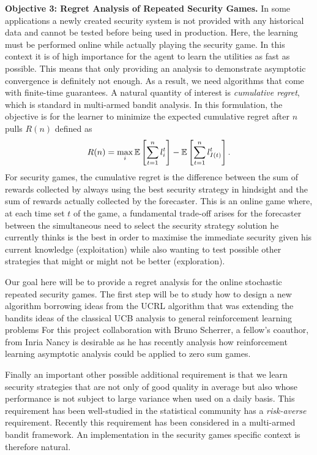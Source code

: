 \textbf{Objective 3: Regret Analysis of Repeated Security Games.}
In some applications a newly created security system is not provided with any historical data and cannot be tested before being used in production. Here, the learning must be performed online while actually playing the security game. In this context it is of high importance for the agent to learn the utilities as fast as possible. This means that only providing an analysis to demonstrate asymptotic convergence is definitely not enough. As a result, we need algorithms that come with finite-time guarantees. A natural quantity of interest is \textit{cumulative regret},  which is standard  in multi-armed bandit analysis. In this formulation, the objective is for the learner to minimize the expected cumulative regret after $n$ pulls $R(n)$ defined as
%
\begin{equation*}
R(n)=\max_i{\mathbb{E}}\left[\sum^n_{t=1} l^t_{i}\right]-{\mathbb{E}}\left[\sum_{t=1}^n l^t_{I(t)}\right].
\end{equation*}
%
For security games, the cumulative regret is the difference between the sum of rewards collected by always using the best security strategy in hindsight and the sum of rewards actually collected by the forecaster.
This is an online game where, at each time set $t$ of the game, a fundamental trade-off arises for the forecaster between the simultaneous need to select the security strategy solution he currently thinks is the best in order to maximise the immediate security given his current knowledge  (exploitation)  while also wanting to test possible other strategies that might or might not be better (exploration).

Our goal here will be to provide a regret analysis for the online stochastic repeated security games. The first step will be to study  how to design a new algorithm borrowing ideas from the UCRL algorithm \cite{auer2009near} that was extending the bandits ideas of the classical UCB analysis to general reinforcement learning problems
For this project collaboration with  Bruno Scherrer, a fellow's coauthor, from Inria Nancy is desirable as he has recently analysis how reinforcement learning asymptotic analysis could be applied to zero sum games\cite{scherrerapproximate}.


Finally an important other possible additional requirement is that we learn security strategies that are not only of good quality in average but also whose performance is not subject to large variance when used on a daily basis. This requirement has been well-studied in the statistical community has a \textit{risk-averse} requirement. Recently this requirement has been considered in a multi-armed bandit framework\cite{NIPS2012_4753}. An implementation in the security games specific context is therefore natural.


